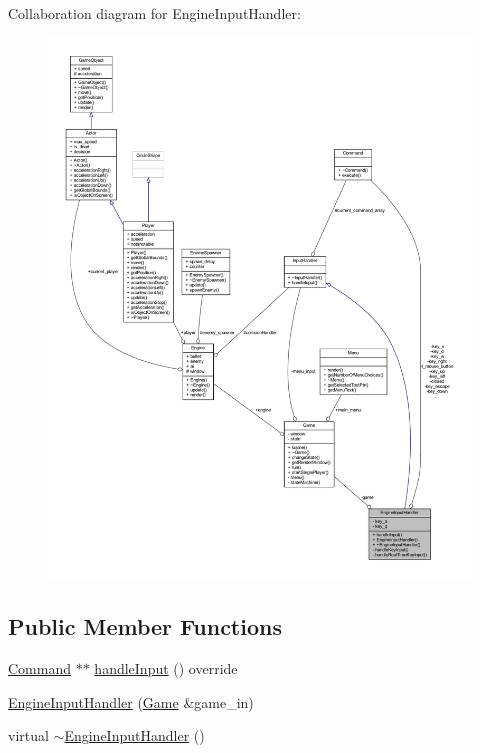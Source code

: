 Collaboration diagram for Engine\+Input\+Handler\+:
\nopagebreak
\begin{figure}[H]
\begin{center}
\leavevmode
\includegraphics[width=350pt]{class_engine_input_handler__coll__graph}
\end{center}
\end{figure}
\subsection*{Public Member Functions}
\begin{DoxyCompactItemize}
\item 
\hyperlink{class_command}{Command} $\ast$$\ast$ \hyperlink{class_engine_input_handler_ade92afaf7657007c2be3b5bd745c96e3}{handle\+Input} () override
\item 
\hyperlink{class_engine_input_handler_ac33be38a17d38deb390b879ceb2e1e2f}{Engine\+Input\+Handler} (\hyperlink{class_game}{Game} \&game\+\_\+in)
\item 
virtual \hyperlink{class_engine_input_handler_a92a875197705110bd6b2debfe7dbee6a}{$\sim$\+Engine\+Input\+Handler} ()
\end{DoxyCompactItemize}
